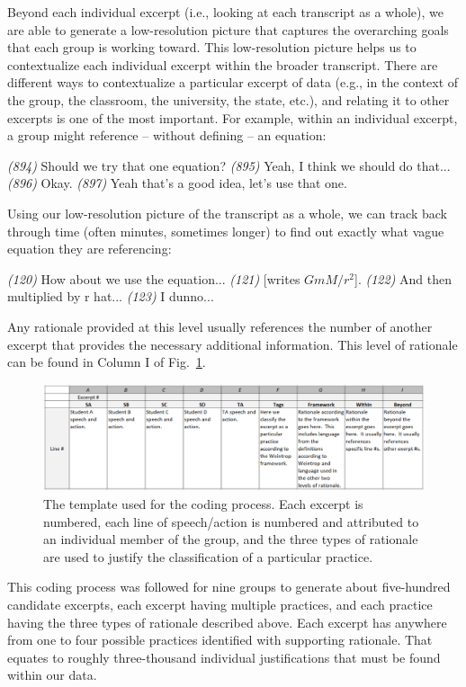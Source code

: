 \documentclass{msuphddissertation}
\begin{document}
\begin{doublespace}
Beyond each individual excerpt (i.e., looking at each transcript as a whole), we are able to generate a low-resolution picture that captures the overarching goals that each group is working toward.  This low-resolution picture helps us to contextualize each individual excerpt within the broader transcript.  There are different ways to contextualize a particular excerpt of data (e.g., in the context of the group, the classroom, the university, the state, etc.), and relating it to other excerpts is one of the most important.  For example, within an individual excerpt, a group might reference -- without defining -- an equation: \begin{description}
\SA \textit{(894)} Should we try {that one} equation?
\SB \textit{(895)} Yeah, I think we should do that...
\SA \textit{(896)} Okay.
\SC \textit{(897)} Yeah that's a good idea, let's use that one.
\end{description}  Using our low-resolution picture of the transcript as a whole, we can track back through time (often minutes, sometimes longer) to find out exactly what vague equation they are referencing: \begin{description}
\SC \textit{(120)} How about we use the equation...
\SC \textit{(121)} [writes $G m M / r^{2}$].
\SC \textit{(122)} And then multiplied by r hat...
\SD \textit{(123)} I dunno...
\end{description}  Any rationale provided at this level usually references the number of another excerpt that provides the necessary additional information.  This level of rationale can be found in Column I of Fig.~\ref{CH5:Types}.

\begin{figure}\centering
\includegraphics[width=\textwidth]{./images/CH5Levels.pdf}
\caption{The template used for the coding process.  Each excerpt is numbered, each line of speech/action is numbered and attributed to an individual member of the group, and the three types of rationale are used to justify the classification of a particular practice.}\label{CH5:Types}
\end{figure}

This coding process was followed for nine groups to generate about five-hundred candidate excerpts, each excerpt having multiple practices, and each practice having the three types of rationale described above.  Each excerpt has anywhere from one to four possible practices identified with supporting rationale.  That equates to roughly three-thousand individual justifications that must be found within our data.


\end{doublespace}
\end{document}
